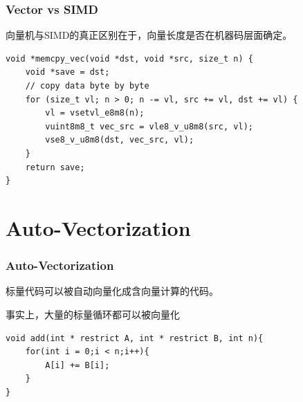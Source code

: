 \documentclass[aspectratio=169]{ctexbeamer}
\begin{document}
\begin{frame}[fragile]
    \frametitle{Vector vs SIMD}

    向量机与SIMD的真正区别在于，向量长度是否在机器码层面确定。

    \begin{lstlisting}
void *memcpy_vec(void *dst, void *src, size_t n) {
    void *save = dst;
    // copy data byte by byte
    for (size_t vl; n > 0; n -= vl, src += vl, dst += vl) {
        vl = vsetvl_e8m8(n);
        vuint8m8_t vec_src = vle8_v_u8m8(src, vl);
        vse8_v_u8m8(dst, vec_src, vl);
    }
    return save;
}
    \end{lstlisting}


\end{frame}

\section{Auto-Vectorization}

\begin{frame}[fragile]
    \frametitle{Auto-Vectorization}

    标量代码可以被自动向量化成含向量计算的代码。

    事实上，大量的标量循环都可以被向量化

    \begin{lstlisting}
void add(int * restrict A, int * restrict B, int n){
    for(int i = 0;i < n;i++){
        A[i] += B[i];
    }
}
    \end{lstlisting}


\end{frame}
\end{document}
